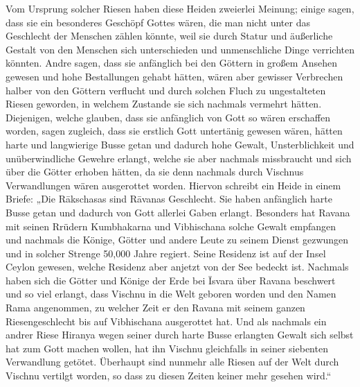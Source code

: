 \documentclass{article}
\begin{document}
Vom Ursprung solcher Riesen haben diese Heiden zweierlei Meinung; einige sagen, dass sie ein besonderes Geschöpf Gottes wären, die man nicht unter das Geschlecht der Menschen zählen könnte, weil sie durch Statur und äußerliche Gestalt von den Menschen sich unterschieden und unmenschliche Dinge verrichten könnten. Andre sagen, dass sie anfänglich bei den Göttern in großem Ansehen gewesen und hohe Bestallungen gehabt hätten, wären aber gewisser Verbrechen halber von den Göttern verflucht und durch solchen Fluch zu ungestalteten Riesen geworden, in welchem Zustande sie sich nachmals vermehrt hätten. Diejenigen, welche glauben, dass sie anfänglich von Gott so wären erschaffen worden, sagen zugleich, dass sie erstlich Gott untertänig gewesen wären, hätten harte und langwierige Busse getan und dadurch hohe Gewalt, Unsterblichkeit und unüberwindliche Gewehre erlangt, welche sie aber nachmals missbraucht und sich über die Götter erhoben hätten, da sie denn nachmals durch Vischnus Verwandlungen wären ausgerottet worden. Hiervon schreibt ein Heide in einem Briefe: „Die R\={a}kschasas sind R\={a}vanas Geschlecht. Sie haben anfänglich harte Busse getan und dadurch von Gott allerlei Gaben erlangt. Besonders hat Ravana mit seinen Rrüdern Kumbhakarna und Vibhischana solche Gewalt empfangen und nachmals die Könige, Götter und andere Leute zu seinem Dienst gezwungen und in solcher Strenge 50,000 Jahre regiert. Seine Residenz ist auf der Insel Ceylon gewesen, welche Residenz aber anjetzt von der See bedeckt ist. Nachmals haben sich die Götter und Könige der Erde bei \={I}svara über Ravana beschwert und so viel erlangt, dass Vischnu in die Welt geboren worden und den Namen Rama angenommen, zu welcher Zeit er den Ravana mit seinem ganzen Riesengeschlecht bis auf Vibhischana ausgerottet hat. Und als nachmals ein andrer Riese Hiranya wegen seiner durch harte Busse erlangten Gewalt sich selbst hat zum Gott machen wollen, hat ihn Vischnu gleichfalls in seiner siebenten Verwandlung getötet. Überhaupt sind nunmehr alle Riesen auf der Welt durch Vischnu vertilgt worden, so dass zu diesen Zeiten keiner mehr gesehen wird.“
\end{document}
